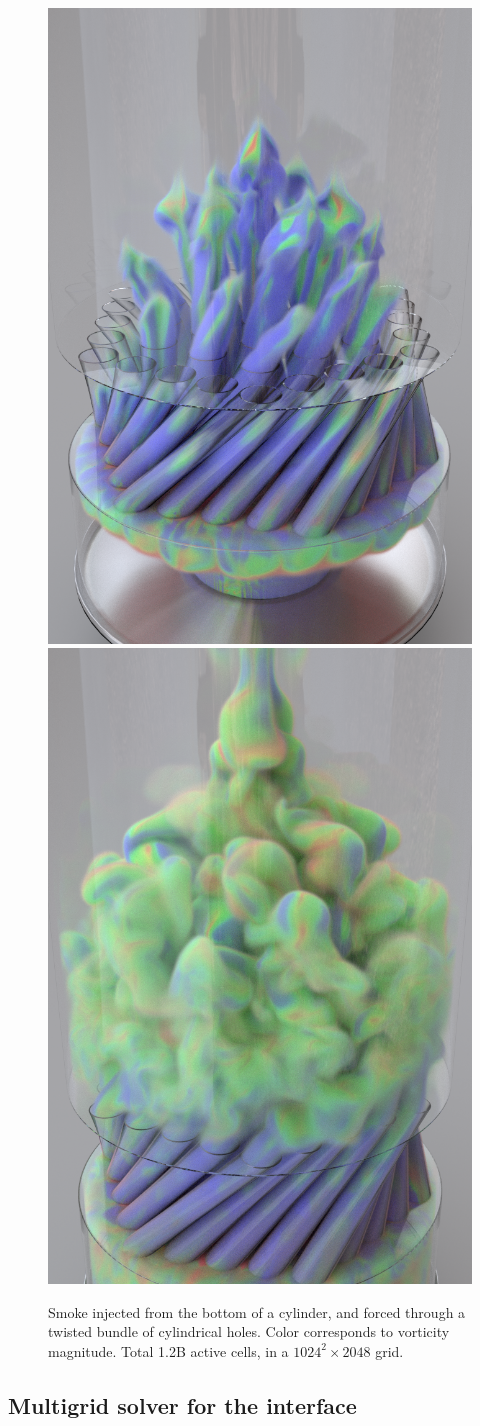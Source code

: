 \begin{figure}[t!]
\begin{center}
\includegraphics[width=.49\columnwidth]{images/DD/sieve_smoke_150_alternate.png} \includegraphics[width=.49\columnwidth]{images/DD/sieve_smoke_255_alternate.png}
\end{center}
\caption{Smoke injected from the bottom of a cylinder, and forced through a
  twisted bundle of cylindrical holes. Color corresponds to vorticity magnitude. Total 1.2B active cells, in a $1024^2\!\times\!2048$ grid.}
\label{fig:sieve}
\end{figure}


\subsection{Multigrid solver for the interface}
\label{sec:interface-multigrid-solver}

